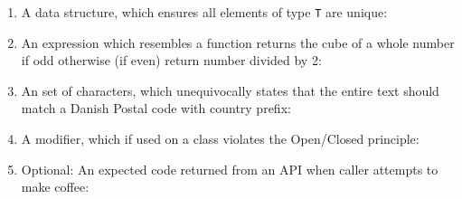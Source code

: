 \begin{enumerate}
	\item A data structure, which ensures all elements of type \texttt{T} are unique:\ %
			\ifdefined\questionThreeAnswerSeven
			  \newline\answer\questionThreeAnswerSeven
			\else
			\fi

	\item An expression which resembles a function returns the cube of a whole number if odd otherwise (if even) return number divided by 2:\ %
			\ifdefined\questionThreeAnswerEight
			  \newline\answer\questionThreeAnswerEight
			\else
			\fi

	\item An set of characters, which unequivocally states that the entire text should match a Danish Postal code with country prefix:\ %
			\ifdefined\questionThreeAnswerNine
			  \newline\answer\questionThreeAnswerNine
			\else
			\fi

	\item A modifier, which if used on a class violates the Open/Closed principle:\ %
			\ifdefined\questionThreeAnswerTen
			  \newline\answer\questionThreeAnswerTen
			\else
			\fi

	\item Optional: An expected code returned from an API when caller attempts to make coffee:\ %
			\ifdefined\questionThreeAnswerEleven
			  \newline\answer\questionThreeAnswerEleven
			\else
			\fi

\end{enumerate}
